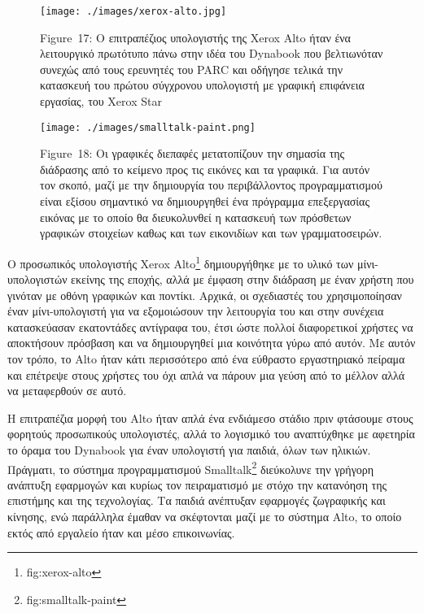 \documentclass[
]{article}
\begin{document}
\leavevmode{}%
\begin{figure}
\hypertarget{fig:xerox-alto}{%
\centering
\texttt{[image: ./images/xerox-alto.jpg]}
\caption{Figure~17: Ο επιτραπέζιος υπολογιστής της Xerox Alto ήταν ένα
λειτουργικό πρωτότυπο πάνω στην ιδέα του Dynabook που βελτιωνόταν
συνεχώς από τους ερευνητές του PARC και οδήγησε τελικά την κατασκευή του
πρώτου σύγχρονου υπολογιστή με γραφική επιφάνεια εργασίας, του Xerox
Star}\label{fig:xerox-alto}
}
\end{figure}

\leavevmode{}%
\begin{figure}
\hypertarget{fig:smalltalk-paint}{%
\centering
\texttt{[image: ./images/smalltalk-paint.png]}
\caption{Figure~18: Οι γραφικές διεπαφές μετατοπίζουν την σημασία της
διάδρασης από το κείμενο προς τις εικόνες και τα γραφικά. Για αυτόν τον
σκοπό, μαζί με την δημιουργία του περιβάλλοντος προγραμματισμού είναι
εξίσου σημαντικό να δημιουργηθεί ένα πρόγραμμα επεξεργασίας εικόνας με
το οποίο θα διευκολυνθεί η κατασκευή των πρόσθετων γραφικών στοιχείων
καθως και των εικονιδίων και των
γραμματοσειρών.}\label{fig:smalltalk-paint}
}
\end{figure}

Ο προσωπικός υπολογιστής Xerox Alto\footnote{fig:xerox-alto}
δημιουργήθηκε με το υλικό των μίνι-υπολογιστών εκείνης της εποχής, αλλά
με έμφαση στην διάδραση με έναν χρήστη που γινόταν με οθόνη γραφικών και
ποντίκι. Αρχικά, οι σχεδιαστές του χρησιμοποίησαν έναν μίνι-υπολογιστή
για να εξομοιώσουν την λειτουργία του και στην συνέχεια κατασκεύασαν
εκατοντάδες αντίγραφα του, έτσι ώστε πολλοί διαφορετικοί χρήστες να
αποκτήσουν πρόσβαση και να δημιουργηθεί μια κοινότητα γύρω από αυτόν. Με
αυτόν τον τρόπο, το Alto ήταν κάτι περισσότερο από ένα εύθραστο
εργαστηριακό πείραμα και επέτρεψε στους χρήστες του όχι απλά να πάρουν
μια γεύση από το μέλλον αλλά να μεταφερθούν σε αυτό.

Η επιτραπέζια μορφή του Alto ήταν απλά ένα ενδιάμεσο στάδιο πριν
φτάσουμε στους φορητούς προσωπικούς υπολογιστές, αλλά το λογισμικό του
αναπτύχθηκε με αφετηρία το όραμα του Dynabook για έναν υπολογιστή για
παιδιά, όλων των ηλικιών. Πράγματι, το σύστημα προγραμματισμού
Smalltalk\footnote{fig:smalltalk-paint} διεύκολυνε την γρήγορη ανάπτυξη
εφαρμογών και κυρίως τον πειραματισμό με στόχο την κατανόηση της
επιστήμης και της τεχνολογίας. Τα παιδιά ανέπτυξαν εφαρμογές ζωγραφικής
και κίνησης, ενώ παράλληλα έμαθαν να σκέφτονται μαζί με το σύστημα Alto,
το οποίο εκτός από εργαλείο ήταν και μέσο επικοινωνίας.
\end{document}
